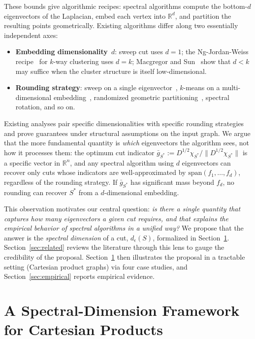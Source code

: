 \documentclass{article}
\theoremstyle{definition}
\theoremstyle{remark}
\begin{document}
These bounds give algorithmic recipes: spectral algorithms compute the bottom-$d$ eigenvectors of the Laplacian, embed each vertex into $\mathbb{R}^d$, and partition the resulting points geometrically. Existing algorithms differ along two essentially independent axes:
\begin{itemize}
    \item \textbf{Embedding dimensionality}~$d$: sweep cut uses $d=1$; the Ng-Jordan-Weiss recipe~\cite{ng2001spectral} for $k$-way clustering uses $d=k$; Macgregor and Sun~\cite{macgregor2022tighter} show that $d < k$ may suffice when the cluster structure is itself low-dimensional.
    \item \textbf{Rounding strategy}: sweep on a single eigenvector~\cite{mohar1989isoperimetric}, $k$-means on a multi-dimensional embedding~\cite{ng2001spectral, peng2015partitioning}, randomized geometric partitioning~\cite{lee2014multiway}, spectral rotation, and so on.
\end{itemize}
Existing analyses pair specific dimensionalities with specific rounding strategies and prove guarantees under structural assumptions on the input graph. We argue that the more fundamental quantity is \emph{which} eigenvectors the algorithm sees, not how it processes them: the optimum cut indicator $\bar g_{S^*} := D^{1/2} \chi_{S^*} / \|D^{1/2} \chi_{S^*}\|$ is a specific vector in $\mathbb{R}^n$, and any spectral algorithm using $d$ eigenvectors can recover only cuts whose indicators are well-approximated by $\mathrm{span}(f_1, \ldots, f_d)$, regardless of the rounding strategy. If $\bar g_{S^*}$ has significant mass beyond $f_d$, no rounding can recover $S^*$ from a $d$-dimensional embedding.

This observation motivates our central question: \emph{is there a single quantity that captures how many eigenvectors a given cut requires, and that explains the empirical behavior of spectral algorithms in a unified way?} We propose that the answer is the \emph{spectral dimension} of a cut, $d_\epsilon(S)$, formalized in Section~\ref{sec:theory}. Section~\ref{sec:related} reviews the literature through this lens to gauge the credibility of the proposal. Section~\ref{sec:theory} then illustrates the proposal in a tractable setting (Cartesian product graphs) via four case studies, and Section~\ref{sec:empirical} reports empirical evidence.


\section{A Spectral-Dimension Framework for Cartesian Products}
\label{sec:theory}
\end{document}
